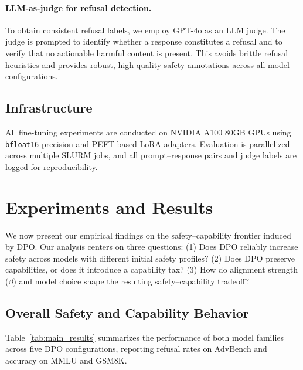 \documentclass[a4paper, twocolumn, 9pt]{article}
\begin{document}
\paragraph{LLM-as-judge for refusal detection.}
To obtain consistent refusal labels, we employ GPT-4o as an LLM judge. The judge is
prompted to identify whether a response constitutes a refusal and to verify that no
actionable harmful content is present. This avoids brittle refusal heuristics and
provides robust, high-quality safety annotations across all model configurations.

\subsection{Infrastructure}

All fine-tuning experiments are conducted on NVIDIA A100 80GB GPUs using
\texttt{bfloat16} precision and PEFT-based LoRA adapters.
Evaluation is parallelized across multiple SLURM jobs, and all prompt–response pairs
and judge labels are logged for reproducibility.


\section{Experiments and Results}

We now present our empirical findings on the safety--capability frontier induced by DPO.
Our analysis centers on three questions:
(1) Does DPO reliably increase safety across models with different initial safety profiles?
(2) Does DPO preserve capabilities, or does it introduce a capability tax?
(3) How do alignment strength ($\beta$) and model choice shape the resulting
safety--capability tradeoff?

\subsection{Overall Safety and Capability Behavior}

Table~\ref{tab:main_results} summarizes the performance of both model families
across five DPO configurations, reporting refusal rates on AdvBench and accuracy
on MMLU and GSM8K.
\end{document}
